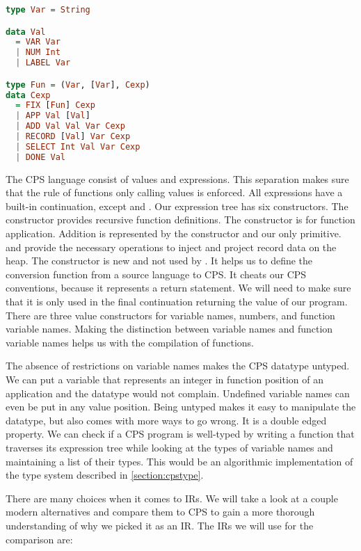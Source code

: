 \begin{lstlisting}[language=Haskell]
type Var = String

data Val
  = VAR Var
  | NUM Int
  | LABEL Var

type Fun = (Var, [Var], Cexp)
data Cexp
  = FIX [Fun] Cexp
  | APP Val [Val]
  | ADD Val Val Var Cexp
  | RECORD [Val] Var Cexp
  | SELECT Int Val Var Cexp
  | DONE Val
\end{lstlisting}

The \ac{CPS} language consist of values and expressions. This separation makes sure that the rule of functions only calling values is enforced. All expressions have a built-in continuation, except  and . Our expression tree has six constructors. The  constructor provides recursive function definitions. The  constructor is for function application. Addition is represented by the  constructor and our only primitive.  and  provide the necessary operations to inject and project record data on the heap. The  constructor is new and not used by \citeauthor{DBLP:books/daglib/0022396}. It helps us to define the conversion function from a source language to \ac{CPS}. It cheats our \ac{CPS} conventions, because it represents a return statement. We will need to make sure that it is only used in the final continuation returning the value of our program. There are three value constructors for variable names, numbers, and function variable names. Making the distinction between variable names and function variable names helps us with the compilation of functions. 

The absence of restrictions on variable names makes the \ac{CPS} datatype untyped. We can put a variable that represents an integer in function position of an application and the datatype would not complain. Undefined variable names can even be put in any value position. Being untyped makes it easy to manipulate the datatype, but also comes with more ways to go wrong. It is a double edged property. We can check if a \ac{CPS} program is well-typed by writing a function that traverses its expression tree while looking at the types of variable names and maintaining a list of their types. This would be an algorithmic implementation of the type system described in \ref{section:cpstype}.

There are many choices when it comes to \acp{IR}. We will take a look at a couple modern alternatives and compare them to \ac{CPS} to gain a more thorough understanding of why we picked it as an \ac{IR}. The \acp{IR} we will use for the comparison are:

